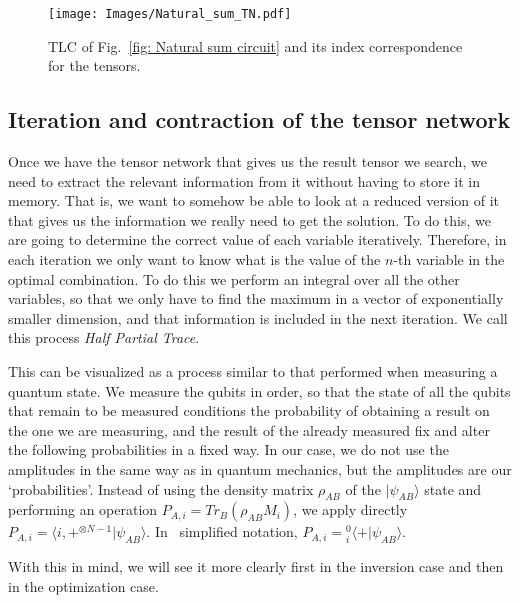 \begin{figure}
    \centering
    \texttt{[image: Images/Natural\_sum\_TN.pdf]}
    \caption{TLC of Fig.~\ref{fig: Natural sum circuit} and its index correspondence for the tensors.}
    \label{fig: Natural sum TN}
\end{figure}

\subsection{Iteration and contraction of the tensor network}
Once we have the tensor network that gives us the result tensor we search, we need to extract the relevant information from it without having to store it in memory. That is, we want to somehow be able to look at a reduced version of it that gives us the information we really need to get the solution. To do this, we are going to determine the correct value of each variable iteratively. Therefore, in each iteration we only want to know what is the value of the $n$-th variable in the optimal combination. To do this we  perform an integral over all the other variables, so that we only have to find the maximum in a vector of exponentially smaller dimension, and that information is included in the next iteration. We call this process \textit{Half Partial Trace}.

This can be visualized as a process similar to that performed when measuring a quantum state. We measure the qubits in order, so that the state of all the qubits that remain to be measured conditions the probability of obtaining a result on the one we are measuring, and the result of the already measured fix and alter the following probabilities in a fixed way. In our case, we do not use the amplitudes in the same way as in quantum mechanics, but the amplitudes are our `probabilities'. Instead of using the density matrix $\rho_{AB}$ of the $|\psi_{AB}\rangle$ state and performing an operation $P_{A,i} = Tr_{B}(\rho_{AB} M_i)$, we apply directly $P_{A,i} = \langle i,+^{\otimes N-1}|\psi_{AB}\rangle$. In~\cite{Escanez_Notation} simplified notation, $P_{A,i} = {}^{0}_{i}\langle +|\psi_{AB}\rangle$.

With this in mind, we will see it more clearly first in the inversion case and then in the optimization case.


